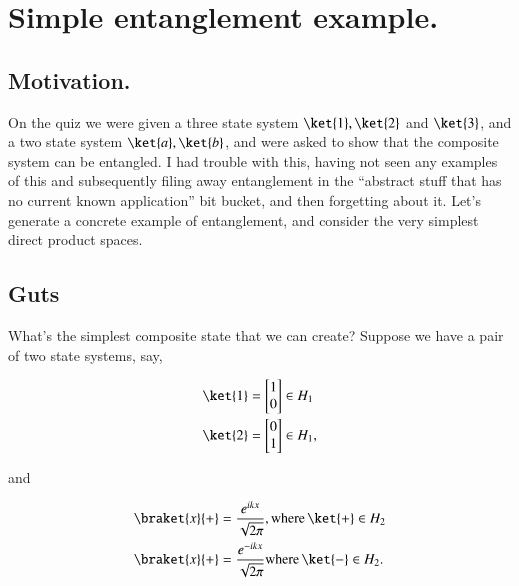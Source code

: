 %
%

\chapter{Simple entanglement example.}
\label{chap:entangledSimpleExample}
{}
\date{Oct 9, 2011}

\beginArtWithToc

\section{Motivation.}

On the quiz we were given a three state system $\ket{1}, \ket{2}$ and $\ket{3}$, and a two state system $\ket{a}, \ket{b}$, and were asked to show that the composite system can be entangled.  I had trouble with this, having not seen any examples of this and subsequently filing away entanglement in the ``abstract stuff that has no current known application'' bit bucket, and then forgetting about it.  Let's generate a concrete example of entanglement, and consider the very simplest direct product spaces.

\section{Guts}

What's the simplest composite state that we can create?  Suppose we have a pair of two state systems, say,

\begin{align}\label{eqn:entangledSimpleExample:10}
\ket{1} 
&= 
\begin{bmatrix}
1 \\
0
\end{bmatrix} \in H_1 \\
\ket{2} 
&= 
\begin{bmatrix}
0 \\
1 
\end{bmatrix} \in H_1,
\end{align}

and

\begin{align}\label{eqn:entangledSimpleExample:30}
\braket{x}{+} 
&= 
\frac{e^{i k x}}{\sqrt{2\pi}},
\text{where}\, \ket{+} \in H_2 \\
\braket{x}{+} 
&= 
\frac{e^{-i k x}}{\sqrt{2\pi}}
\text{where}\, \ket{-} \in H_2.
\end{align}

